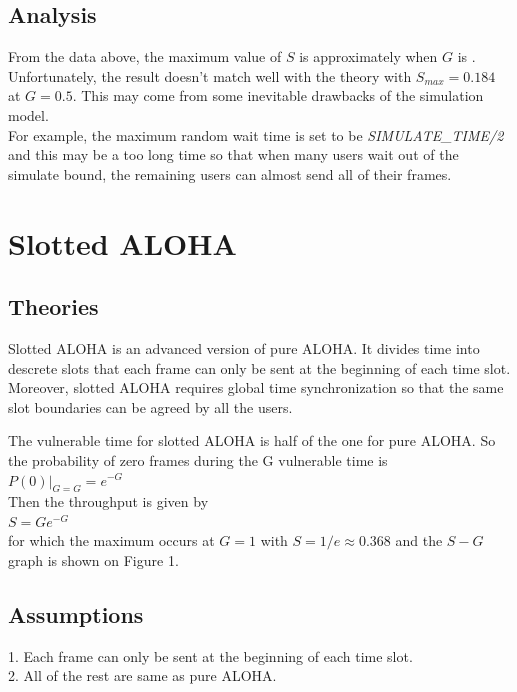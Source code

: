 \documentclass[11pt,a4paper]{report}
\begin{document}
\subsection*{Analysis}

From the data above, the maximum value of \(S\) is approximately    when \(G\) is . Unfortunately, the result doesn't match well with the theory with \(S_{max} = 0.184\) at \(G = 0.5\). This may come from some inevitable drawbacks of the simulation model. \\

For example, the maximum random wait time is set to be \emph{SIMULATE\_TIME/2} and this may be a too long time so that when many users wait out of the simulate bound, the remaining users can almost send all of their frames. \\


\section*{Slotted ALOHA}


\subsection*{Theories}

Slotted ALOHA is an advanced version of pure ALOHA. It divides time into descrete slots that each frame can only be sent at the beginning of each time slot. Moreover, slotted ALOHA requires global time synchronization so that the same slot boundaries can be agreed by all the users.

The vulnerable time for slotted ALOHA is half of the one for pure ALOHA. So the probability of zero frames during the G vulnerable time is \\

\qquad \(P(0)|_{G=G} = e^{-G}\) \\

Then the throughput is given by \\

\qquad \(S = Ge^{-G}\) \\

for which the maximum occurs at \(G = 1\) with \(S = 1/e \approx 0.368\) and the \(S - G\) graph is shown on Figure 1.

\subsection*{Assumptions}

1. Each frame can only be sent at the beginning of each time slot. \\
2. All of the rest are same as pure ALOHA.
\end{document}
